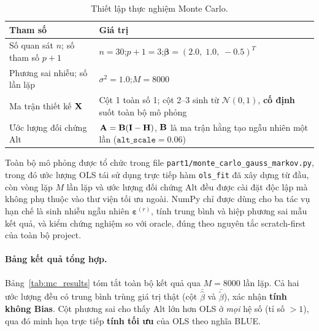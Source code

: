 \begin{table}[H]
\centering
\caption{Thiết lập thực nghiệm Monte Carlo.}
\label{tab:mc_setup}
\begin{tabular}{>{\raggedright}p{}
                >{\raggedright\arraybackslash}p{}}
\toprule
\textbf{Tham số} & \textbf{Giá trị} \\
\midrule
Số quan sát $n$; số tham số $p+1$
    & $n = 30$;\quad $p+1 = 3$;\quad $\boldsymbol{\beta} = (2.0,\; 1.0,\; -0.5)^T$ \\[4pt]
Phương sai nhiễu; số lần lặp
    & $\sigma^2 = 1.0$;\quad $M = 8000$ \\[4pt]
Ma trận thiết kế $\mathbf{X}$
    & Cột 1 toàn số 1; cột 2--3 sinh từ $\mathcal{N}(0,1)$, \textbf{cố định} suốt toàn bộ mô phỏng \\[4pt]
Ước lượng đối chứng Alt
    & $\mathbf{A} = \mathbf{B}(\mathbf{I}-\mathbf{H})$, $\mathbf{B}$ là ma trận hằng tạo ngẫu nhiên một lần ($\mathtt{alt\_scale} = 0.06$) \\
\bottomrule
\end{tabular}
\end{table}


Toàn bộ mô phỏng được tổ chức trong file \texttt{part1/monte\_carlo\_gauss\_markov.py}, trong đó ước lượng OLS tái sử dụng trực tiếp hàm \texttt{ols\_fit} đã xây dựng từ đầu, còn vòng lặp $M$ lần lặp và ước lượng đối chứng Alt đều được cài đặt độc lập mà không phụ thuộc vào thư viện tối ưu ngoài. NumPy chỉ được dùng cho ba tác vụ hạn chế là sinh nhiễu ngẫu nhiên $\boldsymbol{\varepsilon}^{(r)}$, tính trung bình và hiệp phương sai mẫu kết quả, và kiểm chứng nghiệm so với oracle, đúng theo nguyên tắc scratch-first của toàn bộ project.


\paragraph{Bảng kết quả tổng hợp.}
Bảng~\ref{tab:mc_results} tóm tắt toàn bộ kết quả qua $M = 8000$ lần lặp. Cả hai ước lượng
đều có trung bình trùng giá trị thật (cột $\bar{\hat{\beta}}$ và $\bar{\tilde{\beta}}$),
xác nhận \textbf{tính không Bias}. Cột phương sai cho thấy Alt lớn hơn OLS ở \textit{mọi}
hệ số (tỉ số $> 1$), qua đó minh họa trực tiếp \textbf{tính tối ưu} của OLS theo nghĩa BLUE.

